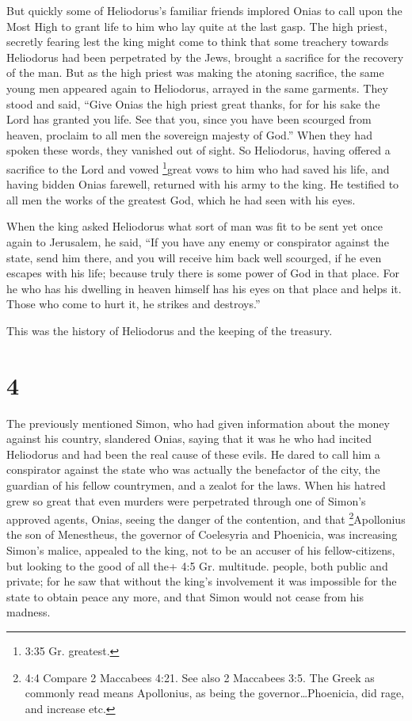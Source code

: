  But quickly some of Heliodorus's familiar friends implored
Onias to call upon the Most High to grant life to him who lay quite at
the last gasp.  The high priest, secretly fearing lest the
king might come to think that some treachery towards Heliodorus had been
perpetrated by the Jews, brought a sacrifice for the recovery of the
man.  But as the high priest was making the atoning
sacrifice, the same young men appeared again to Heliodorus, arrayed in
the same garments. They stood and said, ``Give Onias the high priest
great thanks, for for his sake the Lord has granted you life.
 See that you, since you have been scourged from heaven,
proclaim to all men the sovereign majesty of God.'' When they had spoken
these words, they vanished out of sight.  So Heliodorus,
having offered a sacrifice to the Lord and vowed \footnote{3:35 Gr.
  greatest.}great vows to him who had saved his life, and having bidden
Onias farewell, returned with his army to the king.  He
testified to all men the works of the greatest God, which he had seen
with his eyes.

 When the king asked Heliodorus what sort of man was fit to
be sent yet once again to Jerusalem, he said,  ``If you
have any enemy or conspirator against the state, send him there, and you
will receive him back well scourged, if he even escapes with his life;
because truly there is some power of God in that place. 
For he who has his dwelling in heaven himself has his eyes on that place
and helps it. Those who come to hurt it, he strikes and destroys.''

 This was the history of Heliodorus and the keeping of the
treasury.

\hypertarget{section-2}{%
\section{4}\label{section-2}}

 The previously mentioned Simon, who had given information
about the money against his country, slandered Onias, saying that it was
he who had incited Heliodorus and had been the real cause of these
evils.  He dared to call him a conspirator against the state
who was actually the benefactor of the city, the guardian of his fellow
countrymen, and a zealot for the laws.  When his hatred grew
so great that even murders were perpetrated through one of Simon's
approved agents,  Onias, seeing the danger of the
contention, and that \footnote{4:4 Compare 2 Maccabees 4:21. See also 2
  Maccabees 3:5. The Greek as commonly read means Apollonius, as being
  the governor\ldots Phoenicia, did rage, and increase etc.}Apollonius
the son of Menestheus, the governor of Coelesyria and Phoenicia, was
increasing Simon's malice,  appealed to the king, not to be
an accuser of his fellow-citizens, but looking to the good of all the+
4:5 Gr. multitude. people, both public and private;  for he
saw that without the king's involvement it was impossible for the state
to obtain peace any more, and that Simon would not cease from his
madness.

